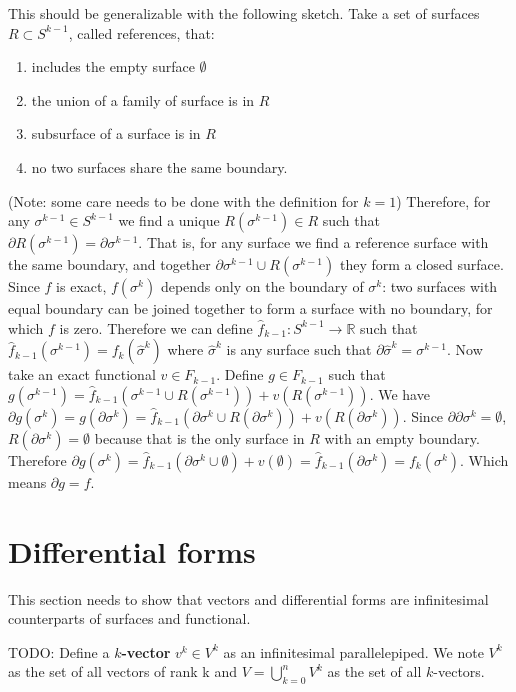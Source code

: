 \begin{remark}
	This should be generalizable with the following sketch. Take a set of surfaces $R \subset S^{k-1}$, called references, that:
	\begin{enumerate}
		\item includes the empty surface $\emptyset$
		\item the union of a family of surface is in $R$
		\item subsurface of a surface is in $R$
		\item no two surfaces share the same boundary.
	\end{enumerate}
	(Note: some care needs to be done with the definition for $k=1$) Therefore, for any $\sigma^{k-1} \in S^{k-1}$ we find a unique $R(\sigma^{k-1}) \in R$ such that $\partial R(\sigma^{k-1}) = \partial \sigma^{k-1}$. That is, for any surface we find a reference surface with the same boundary, and together $\partial \sigma^{k-1} \cup R(\sigma^{k-1})$ they form a closed surface. Since $f$ is exact, $f(\sigma^k)$ depends only on the boundary of $\sigma^k$: two surfaces with equal boundary can be joined together to form a surface with no boundary, for which $f$ is zero. Therefore we can define $\hat{f}_{k-1} : S^{k-1} \to \mathbb{R}$ such that $\hat{f}_{k-1}(\sigma^{k-1}) = f_k(\hat{\sigma}^{k})$ where $\hat{\sigma}^{k}$ is any surface such that $\partial \hat{\sigma}^{k} = \sigma^{k-1}$. Now take an exact functional $v \in F_{k-1}$. Define $g \in F_{k-1}$ such that $g(\sigma^{k-1}) = \hat{f}_{k-1}(\sigma^{k-1} \cup R(\sigma^{k-1})) + v(R(\sigma^{k-1}))$. We have $\partial g(\sigma^{k}) = g(\partial \sigma^{k}) = \hat{f}_{k-1}(\partial \sigma^{k} \cup R(\partial \sigma^{k})) + v(R(\partial \sigma^{k}))$. Since $\partial \partial \sigma^k = \emptyset$, $R(\partial \sigma^{k}) = \emptyset$ because that is the only surface in $R$ with an empty boundary. Therefore $\partial g(\sigma^k) = \hat{f}_{k-1}(\partial \sigma^k \cup \emptyset) + v(\emptyset) = \hat{f}_{k-1}(\partial \sigma^k) = f_k(\sigma^k)$. Which means $\partial g = f$.
\end{remark}


\iffalse

\section{Differential forms}

This section needs to show that vectors and differential forms are infinitesimal counterparts of surfaces and functional. 


\begin{defn}
	TODO: Define a \textbf{$k$-vector} $v^k \in V^k$ as an infinitesimal parallelepiped. We note $V^k$ as the set of all vectors of rank k and $V = \bigcup_{k=0}^n V^k$ as the set of all $k$-vectors. 
\end{defn}


